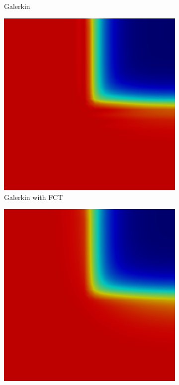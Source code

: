 \begin{figure}[h]
\begin{subfigure}{0.3\textwidth}
      \caption{Galerkin}
   \end{subfigure}
   \begin{subfigure}{0.3\textwidth}
      \includegraphics[width=\textwidth]{skew_void_to_absorber/GalFCT.png}
      \caption{Galerkin with FCT}
   \end{subfigure}
   \begin{subfigure}{0.3\textwidth}
      \includegraphics[width=\textwidth]{skew_void_to_absorber/low.png}

\end{subfigure}
\end{figure}
